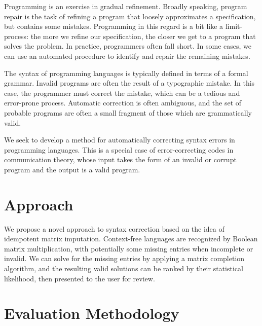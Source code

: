 \documentclass[sigplan,screen]{acmart}
\begin{document}

Programming is an exercise in gradual refinement. Broadly speaking, program repair is the task of refining a program that loosely approximates a specification, but contains some mistakes. Programming in this regard is a bit like a limit-process: the more we refine our specification, the closer we get to a program that solves the problem. In practice, programmers often fall short. In some cases, we can use an automated procedure to identify and repair the remaining mistakes.

The syntax of programming languages is typically defined in terms of a formal grammar. Invalid programs are often the result of a typographic mistake. In this case, the programmer must correct the mistake, which can be a tedious and error-prone process. Automatic correction is often ambiguous, and the set of probable programs are often a small fragment of those which are grammatically valid.

We seek to develop a method for automatically correcting syntax errors in programming languages. This is a special case of error-correcting codes in communication theory, whose input takes the form of an invalid or corrupt program and the output is a valid program.

\section{Approach}


We propose a novel approach to syntax correction based on the idea of idempotent matrix imputation. Context-free languages are recognized by Boolean matrix multiplication, with potentially some missing entries when incomplete or invalid. We can solve for the missing entries by applying a matrix completion algorithm, and the resulting valid solutions can be ranked by their statistical likelihood, then presented to the user for review.

\section{Evaluation Methodology}
\end{document}
